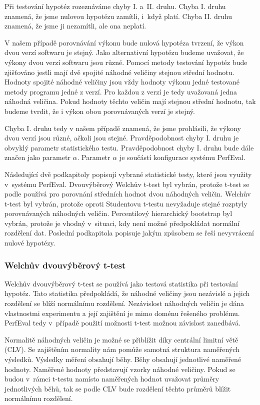 Při testování hypotéz rozeznáváme
chyby I. a~II. druhu. Chyba I. druhu znamená, že jsme nulovou hypotézu zamítli,
i~když platí. Chyba II. druhu znamená, že jsme ji nezamítli, ale ona neplatí.

V našem případě porovnávání výkonu bude nulová hypotéza tvrzení, že výkon dvou verzí softwaru je stejný.
Jako alternativní hypotézu budeme uvažovat, že výkony dvou verzí softwaru jsou různé.
Pomocí metody testování hypotéz bude zjišťováno jestli mají dvě spojité náhodné veličiny stejnou střední hodnotu.
Hodnoty spojité náhodné veličiny jsou vždy hodnoty výkonu jedné testované metody programu jedné z verzí.
Pro každou z verzí je tedy uvažovaná jedna náhodná veličina.
Pokud hodnoty těchto veličin mají stejnou střední hodnotu, tak budeme tvrdit, že i výkon obou porovnávaných
verzí je stejný.

Chyba I. druhu tedy v našem případě znamená, že jsme prohlásili, že výkony dvou verzí jsou různé,
ačkoli jsou stejné. Pravděpodobnost chyby I. druhu je obvyklý parametr statistického testu.
Pravděpodobnost chyby I. druhu bude dále značen jako parametr $\alpha$. Parametr $\alpha$
je součástí konfigurace systému PerfEval.

Následující dvě podkapitoly popisují vybrané statistické testy, které jsou využity v~systému PerfEval.
Dvouvýběrový Welchův t-test byl vybrán, protože t-test se podle \cite[]{samal_nmai059_nodate} používá pro porovnání
středních hodnot dvou náhodných veličin. Welchův t-test byl vybrán, protože oproti Studentovu t-testu nevyžaduje
stejné rozptyly porovnávaných náhodných veličin. Percentilový hierarchický bootstrap byl vybrán, protože
je vhodný v~situaci, kdy není možné předpokládat normální rozdělení dat.
Poslední podkapitola popisuje jakým způsobem se řeší nevyvrácení nulové hypotézy.

\subsubsection{Welchův dvouvýběrový t-test}

Welchův dvouvýběrový t-test se používá jako testová statistika při testování hypotéz.
Tato statistika předpokládá, že náhodné veličiny jsou nezávislé a jejich rozdělení
se blíží normálnímu rozdělení. Nezávislost náhodných veličin je dána vlastnostmi
experimentu \cite[]{twosampletests} a její zajištění je mimo doménu řešeného problému. PerfEval
tedy v~případě použití možnosti t-test možnou závislost zanedbává.

Normalitě náhodných veličin je možné se přiblížit díky centrální limitní větě (CLV).
Se zajištěním normality nám pomůže samotná struktura naměřených výsledků. Výsledky měření
obsahují běhy. Běhy obsahují jednotlivé naměřené hodnoty. Naměřené hodnoty představují
vzorky náhodné veličiny. Pokud se budou v~rámci t-testu namísto naměřených hodnot uvažovat
průměry jednotlivých běhů, tak se podle CLV bude rozdělení těchto průměrů blížit normálnímu rozdělení.

